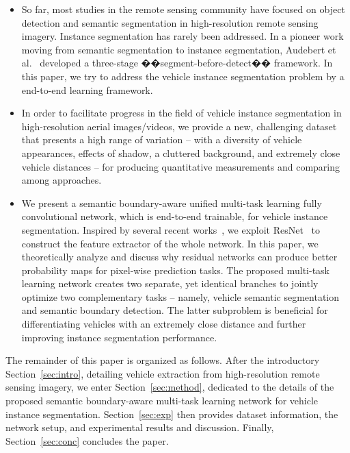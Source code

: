 \documentclass[journal]{IEEEtran}
\begin{document}
\begin{itemize}
  \item So far, most studies in the remote sensing community have focused on object detection and semantic segmentation in high-resolution remote sensing imagery. Instance segmentation has rarely been addressed. In a pioneer work moving from semantic segmentation to instance segmentation, Audebert et al.~\cite{AudebertRS17} developed a three-stage ��segment-before-detect�� framework. In this paper, we try to address the vehicle instance segmentation problem by a end-to-end learning framework.
  \item In order to facilitate progress in the field of vehicle instance segmentation in high-resolution aerial images/videos, we provide a new, challenging dataset that presents a high range of variation -- with a diversity of vehicle appearances, effects of shadow, a cluttered background, and extremely close vehicle distances -- for producing quantitative measurements and comparing among approaches.
  \item We present a semantic boundary-aware unified multi-task learning fully convolutional network, which is end-to-end trainable, for vehicle instance segmentation. Inspired by several recent works~\cite{Zhaocvpr17,Wu16,Laina16}, we exploit ResNet~\cite{ResNet} to construct the feature extractor of the whole network. In this paper, we theoretically analyze and discuss why residual networks can produce better probability maps for pixel-wise prediction tasks. The proposed multi-task learning network creates  two separate, yet identical branches to jointly optimize two complementary tasks -- namely, vehicle semantic segmentation and semantic boundary detection. The latter subproblem is beneficial for differentiating vehicles with an extremely close distance and further improving instance segmentation performance.
\end{itemize}
\par
The remainder of this paper is organized as follows. After the introductory Section~\ref{sec:intro}, detailing vehicle extraction from high-resolution remote sensing imagery, we enter Section~\ref{sec:method}, dedicated to the details of the proposed semantic boundary-aware multi-task learning network for vehicle instance segmentation. Section~\ref{sec:exp} then provides dataset information, the network setup, and experimental results and discussion. Finally, Section~\ref{sec:conc} concludes the paper.
\end{document}

